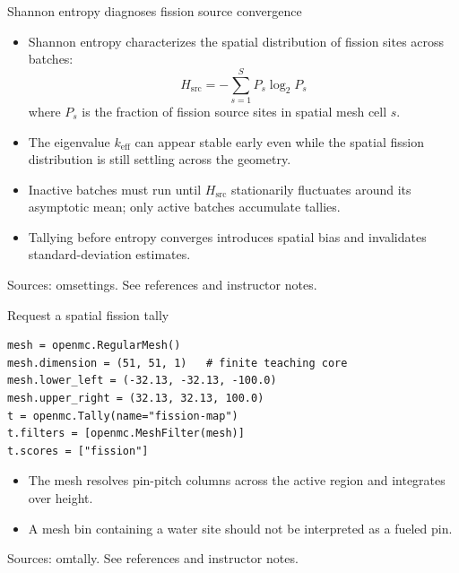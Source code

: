 \documentclass[aspectratio=169,11pt]{beamer}
\begin{document}
\begin{frame}[t,fragile]{Shannon entropy diagnoses fission source convergence}
\fontsize{11.5}{14}\selectfont
\begin{itemize}\setlength{\itemsep}{2mm}
\item Shannon entropy characterizes the spatial distribution of fission sites across batches:
\[H_{\mathrm{src}} = -\sum_{s=1}^{S} P_s \log_2 P_s\]
where $P_s$ is the fraction of fission source sites in spatial mesh cell $s$.
\item The eigenvalue $k_{\mathrm{eff}}$ can appear stable early even while the spatial fission distribution is still settling across the geometry.
\item Inactive batches must run until $H_{\mathrm{src}}$ stationarily fluctuates around its asymptotic mean; only active batches accumulate tallies.
\item Tallying before entropy converges introduces spatial bias and invalidates standard-deviation estimates.
\end{itemize}
\vfill{\fontsize{6.5}{8}\selectfont\color{UTgray} Sources: omsettings. See references and instructor notes.\par}
\end{frame}
\begin{frame}[t,fragile]{Request a spatial fission tally}
\begin{lstlisting}
mesh = openmc.RegularMesh()
mesh.dimension = (51, 51, 1)   # finite teaching core
mesh.lower_left = (-32.13, -32.13, -100.0)
mesh.upper_right = (32.13, 32.13, 100.0)
t = openmc.Tally(name="fission-map")
t.filters = [openmc.MeshFilter(mesh)]
t.scores = ["fission"]
\end{lstlisting}
\fontsize{10.5}{12.5}\selectfont
\begin{itemize}\setlength{\itemsep}{2mm}
\item The mesh resolves pin-pitch columns across the active region and integrates over height.
\item A mesh bin containing a water site should not be interpreted as a fueled pin.
\end{itemize}
\vfill{\fontsize{6.5}{8}\selectfont\color{UTgray} Sources: omtally. See references and instructor notes.\par}
\end{frame}
\end{document}
